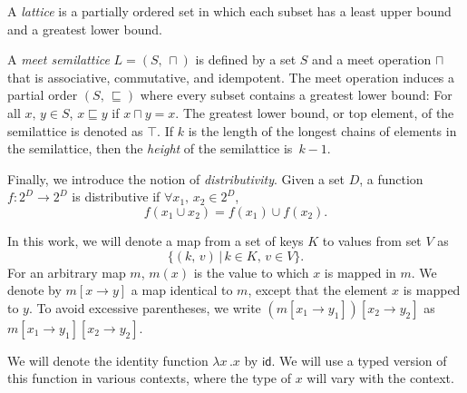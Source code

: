 A \textit{lattice} is a partially ordered set in which each subset has a least upper bound and a greatest lower bound.

A \textit{meet semilattice} $L=(S,\,\sqcap)$ is defined by a set $S$ and a meet operation $\sqcap$ that is  associative, commutative, and idempotent.
  The meet operation induces a partial order $(S,\,\sqsubseteq)$ where every subset contains  a greatest lower bound: For all $x,\,y\in S$, $x\sqsubseteq y$ if $x\sqcap y=x$. The greatest lower bound, or top element, of the semilattice is denoted as $\top$.
  If $k$ is the length of the longest chains of elements in the semilattice, then the \textit{height} of the semilattice is~$k-1$.

Finally, we introduce the notion of \textit{distributivity}. Given a set $D$, a function $f:2^D\to2^D$ is distributive if $\forall x_1,\,x_2\in 2^D$,
\begin{equation}
  f(x_1\cup x_2)=f(x_1)\cup f(x_2).
\end{equation}

In this work, we will denote a map from a set of keys $K$ to values from set $V$ as
\begin{equation}
  \{(k,\,v)\,|\,k\in K,\,v\in V\}.
\end{equation}
For an arbitrary map $m$,  $m(x)$ is the value to which $x$ is mapped in $m$. We denote by $m[x\to y]$ a map identical to $m$, except that the element $x$ is mapped to $y$.
To avoid excessive parentheses, we write $\left(m[x_1\to y_1]\right)[x_2\to y_2]$ as $m[x_1\to y_1][x_2\to y_2]$.

We will denote the identity function $\lambda x\,.x$ by $\textsf{id}$.
We will use a typed version of this function in various contexts, where the type of $x$ will vary with
the context.

